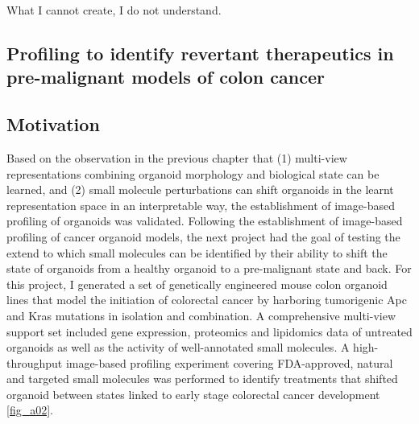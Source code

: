 \begin{savequote}[75mm]
What I cannot create, I do not understand.
\end{savequote}

\begin{flushleft}
\chapter{Profiling to identify revertant therapeutics in pre-malignant models of colon cancer}

\section{Motivation}

Based on the observation in the previous chapter that (1) multi-view representations combining organoid morphology and biological state can be learned, and (2) small molecule perturbations can shift organoids in the learnt representation space in an interpretable way, the establishment of image-based profiling of organoids was validated. Following the establishment of image-based profiling of cancer organoid models, the next project had the goal of testing the extend to which small molecules can be identified by their ability to shift the state of organoids from a healthy organoid to a pre-malignant state and back. For this project, I generated a set of genetically engineered mouse colon organoid lines that model the initiation of colorectal cancer by harboring tumorigenic Apc and Kras mutations in isolation and combination. A comprehensive multi-view support set included gene expression, proteomics and lipidomics data of untreated organoids as well as the activity of well-annotated small molecules. A high-throughput image-based profiling experiment covering FDA-approved, natural and targeted small molecules was performed to identify treatments that shifted organoid between states linked to early stage colorectal cancer development \ref{fig_a02}. 



\end{flushleft}
